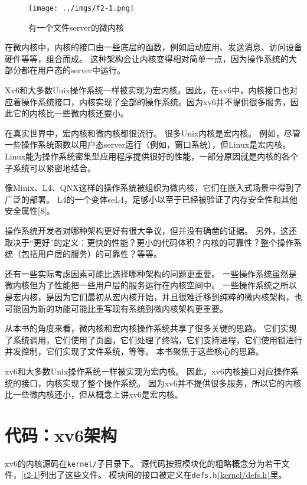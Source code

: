 \begin{figure}[htbp]
    \centering
    \texttt{[image: ../imgs/f2-1.png]}
    \caption{有一个文件server的微内核}
    \label{f2-1}
\end{figure}

在微内核中，内核的接口由一些底层的函数，例如启动应用、发送消息、访问设备硬件等等，组合而成。
这种架构会让内核变得相对简单一点，因为操作系统的大部分都在用户态的server中运行。

Xv6和大多数Unix操作系统一样被实现为宏内核。因此，在xv6中，内核接口也对应着操作系统接口，内核实现了全部的操作系统。因为xv6并不提供很多服务，因此它的内核比一些微内核还要小。

在真实世界中，宏内核和微内核都很流行。
很多Unix内核是宏内核。
例如，尽管一些操作系统函数以用户态server运行（例如，窗口系统），但Linux是宏内核。
Linux能为操作系统密集型应用程序提供很好的性能，一部分原因就是内核的各个子系统可以紧密地结合。

像Minix、L4、QNX这样的操作系统被组织为微内核，它们在嵌入式场景中得到了广泛的部署。
L4的一个变体seL4，足够小以至于已经被验证了内存安全性和其他安全属性[8]。

操作系统开发者对哪种架构更好有很大争议，但并没有确凿的证据。
另外，这还取决于“更好”的定义：更快的性能？更小的代码体积？内核的可靠性？整个操作系统（包括用户层的服务）的可靠性？等等。

还有一些实际考虑因素可能比选择哪种架构的问题更重要。
一些操作系统虽然是微内核但为了性能把一些用户层的服务运行在内核空间中。
一些操作系统之所以是宏内核，是因为它们最初从宏内核开始，并且很难迁移到纯粹的微内核架构，也可能因为新的功能可能比重写现有系统到微内核架构更重要。

从本书的角度来看，微内核和宏内核操作系统共享了很多关键的思路。
它们实现了系统调用，它们使用了页面，它们处理了终端，它们支持进程，它们使用锁进行并发控制，它们实现了文件系统，等等。
本书聚焦于这些核心的思路。

xv6和大多数Unix操作系统一样被实现为宏内核。
因此，xv6内核接口对应操作系统的接口，内核实现了整个操作系统。
因为xv6并不提供很多服务，所以它的内核比一些微内核还小，但从概念上讲xv6是宏内核。

\section{代码：xv6架构}
xv6的内核源码在\texttt{kernel/}子目录下。
源代码按照模块化的粗略概念分为若干文件，\autoref{t2-1}列出了这些文件。
模块间的接口被定义在\texttt{defs.h}\href{https://github.com/mit-pdos/xv6-riscv/blob/riscv//kernel/defs.h}{(kernel/defs.h)}里。

